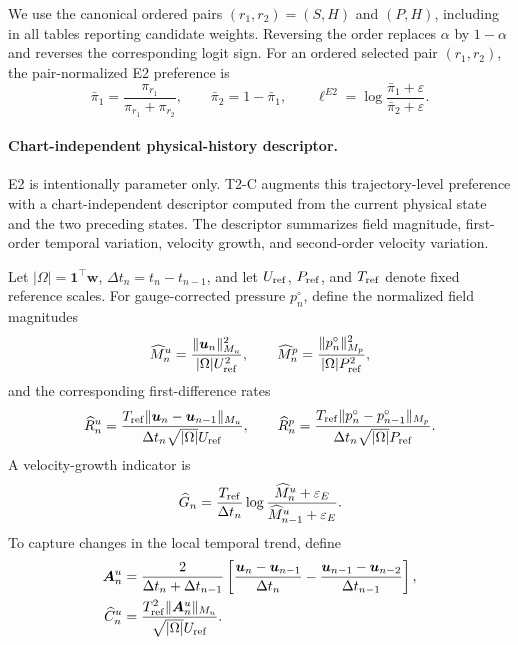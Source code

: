 \documentclass{article}
\providecommand{\DIFaddtex}[1]{{\protect\color{blue} \sf #1}} %
\providecommand{\DIFaddbegin}{} %
\providecommand{\DIFaddend}{} %
\providecommand{\DIFadd}[1]{\texorpdfstring{\DIFaddtex{#1}}{#1}} %
\providecommand{\DIFaddincludegraphics}[2][]{{\color{blue}\fbox{\DIFOincludegraphics[#1]{#2}}}} %
\DeclareRobustCommand{\DIFaddbegin}{\DIFOaddbegin \let\includegraphics\DIFaddincludegraphics} %
\DeclareRobustCommand{\DIFaddend}{\DIFOaddend \let\includegraphics\DIFOincludegraphics} %
\begin{document}
\DIFaddbegin \DIFadd{We use the canonical ordered pairs $(r_1,r_2)=(S,H)$ and $(P,H)$, including in all tables reporting candidate weights. Reversing the order replaces $\alpha$ by $1-\alpha$ and reverses the corresponding logit sign. }\DIFaddend For an ordered selected pair $(r_1,r_2)$, the pair-normalized E2
preference is
\begin{equation}
  \bar\pi_1
  =
  \frac{\pi_{r_1}}{\pi_{r_1}+\pi_{r_2}},
  \qquad
  \bar\pi_2
  =
  1-\bar\pi_1,
  \qquad
  \ell^{E2}
  =
  \log
  \frac{\bar\pi_1+\varepsilon}{\bar\pi_2+\varepsilon}.
  \label{eq:app_pair_logit}
\end{equation}


\paragraph{Chart-independent physical-history descriptor.}
E2 is intentionally parameter only.
T2-C augments this trajectory-level preference with a chart-independent
descriptor computed from the current physical state and the two preceding
states.
The descriptor summarizes field magnitude, first-order temporal variation,
velocity growth, and second-order velocity variation.

Let
$|\Omega|=\bm 1^\top\bm w$,
$\Delta t_n=t_n-t_{n-1}$,
and let $U_{\rm ref}$, $P_{\rm ref}$, and $T_{\rm ref}$ denote fixed
reference scales.
For gauge-corrected pressure $p_n^\circ$, define the normalized field
magnitudes
\begin{equation}
  \widehat M_n^u
  =
  \frac{
    \|\bm u_n\|_{M_u}^2
  }{
    |\Omega|U_{\rm ref}^2
  },
  \qquad
  \widehat M_n^p
  =
  \frac{
    \|p_n^\circ\|_{M_p}^2
  }{
    |\Omega|P_{\rm ref}^2
  },
  \label{eq:app_t2c_magnitude}
\end{equation}
and the corresponding first-difference rates
\begin{equation}
  \widehat R_n^u
  =
  \frac{
    T_{\rm ref}
    \|\bm u_n-\bm u_{n-1}\|_{M_u}
  }{
    \Delta t_n\sqrt{|\Omega|}U_{\rm ref}
  },
  \qquad
  \widehat R_n^p
  =
  \frac{
    T_{\rm ref}
    \|p_n^\circ-p_{n-1}^\circ\|_{M_p}
  }{
    \Delta t_n\sqrt{|\Omega|}P_{\rm ref}
  }.
  \label{eq:app_t2c_rate}
\end{equation}
A velocity-growth indicator is
\begin{equation}
  \widehat G_n
  =
  \frac{T_{\rm ref}}{\Delta t_n}
  \log
  \frac{
    \widehat M_n^u+\varepsilon_E
  }{
    \widehat M_{n-1}^u+\varepsilon_E
  }.
  \label{eq:app_t2c_growth}
\end{equation}
To capture changes in the local temporal trend, define
\begin{align}
  \bm A_n^u
  &=
  \frac{2}{\Delta t_n+\Delta t_{n-1}}
  \left[
    \frac{\bm u_n-\bm u_{n-1}}{\Delta t_n}
    -
    \frac{\bm u_{n-1}-\bm u_{n-2}}{\Delta t_{n-1}}
  \right],
  \nonumber\\
  \widehat C_n^u
  &=
  \frac{
    T_{\rm ref}^2
    \|\bm A_n^u\|_{M_u}
  }{
    \sqrt{|\Omega|}U_{\rm ref}
  }.
  \label{eq:app_t2c_curvature}
\end{align}
\end{document}
